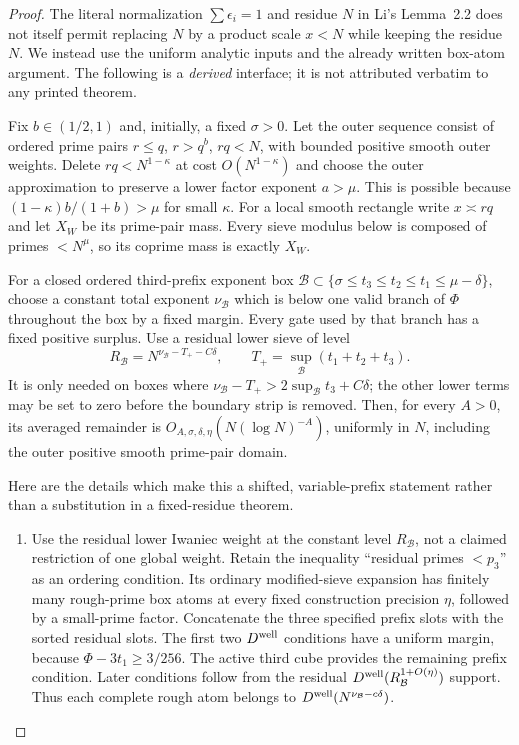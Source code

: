 \documentclass[11pt]{article}
\begin{document}
\begin{proof}
The literal normalization $\sum\epsilon_i=1$ and residue $N$ in
Li's Lemma~2.2 does not itself permit replacing $N$ by a product
scale $x<N$ while keeping the residue $N$. We instead use the
uniform analytic inputs and the already written box-atom argument.
The following is a \emph{derived} interface; it is not attributed
verbatim to any printed theorem.

Fix $b\in(1/2,1)$ and, initially, a fixed $\sigma>0$.
Let the outer sequence consist of ordered prime pairs $r\le q$,
$r>q^b$, $rq<N$, with bounded positive smooth outer weights.
Delete $rq<N^{1-\kappa}$ at cost $O(N^{1-\kappa})$ and choose
the outer approximation to preserve a lower factor exponent
$a>\mu$. This is possible because
$(1-\kappa)b/(1+b)>\mu$ for small $\kappa$.
For a local smooth rectangle write $x\asymp rq$ and let $X_W$
be its prime-pair mass. Every sieve modulus below is composed of
primes $<N^\mu$, so its coprime mass is exactly $X_W$.

For a closed ordered third-prefix exponent box
$\mathcal B\subset\{\sigma\le t_3\le t_2\le t_1\le\mu-\delta\}$,
choose a constant total exponent $\nu_\mathcal B$ which is below
one valid branch of $\Phi$ throughout the box by a fixed margin.
Every gate used by that branch has a fixed positive surplus.
Use a residual lower sieve of level
\[
 R_\mathcal B=N^{\nu_\mathcal B-T_+-C\delta},
 \qquad T_+=\sup_{\mathcal B}(t_1+t_2+t_3).
\]
It is only needed on boxes where
$\nu_\mathcal B-T_+>2\sup_{\mathcal B}t_3+C\delta$;
the other lower terms may be set to zero before the boundary
strip is removed. Then, for every $A>0$, its averaged remainder
is $O_{A,\sigma,\delta,\eta}(N(\log N)^{-A})$, uniformly in $N$,
including the outer positive smooth prime-pair domain.

Here are the details which make this a shifted, variable-prefix
statement rather than a substitution in a fixed-residue theorem.

\begin{enumerate}
\item
Use the residual lower Iwaniec weight at the constant level
$R_\mathcal B$, not a claimed restriction of one global weight.
Retain the inequality ``residual primes $<p_3$'' as an ordering
condition. Its ordinary modified-sieve expansion has finitely
many rough-prime box atoms at every fixed construction precision
$\eta$, followed by a small-prime factor. Concatenate the three
specified prefix slots with the sorted residual slots.
The first two $D^{\rm well}$ conditions have a uniform margin,
because $\Phi-3t_1\ge3/256$. The active third cube provides
the remaining prefix condition. Later conditions follow from
the residual $D^{\rm well}(R_\mathcal B^{1+O(\eta)})$ support.
Thus each complete rough atom belongs to
$D^{\rm well}(N^{\nu_\mathcal B-c\delta})$.


\end{enumerate}
\end{proof}
\end{document}
